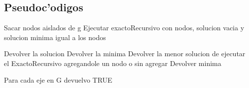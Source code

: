 \subsection{Pseudoc'odigos}

\begin{algorithmic}[1]
\STATE Sacar nodos aislados de g 
\STATE Ejecutar exactoRecursivo con nodos, solucion vacia y solucion minima igual a los nodos  
\end{algorithmic}

\begin{algorithmic}[1]
		\STATE Devolver la solucion
	\ELSE
		\STATE Devolver la minima
	\ENDIF
{}
	\STATE Devolver la menor solucion de ejecutar el ExactoRecursivo agregandole un nodo o sin agregar
\ELSE
	\STATE Devolver minima
\ENDIF
\end{algorithmic}

\begin{algorithmic}[1]
\STATE Para cada eje en G
	\ENDIF
\STATE devuelvo TRUE
\end{algorithmic}
